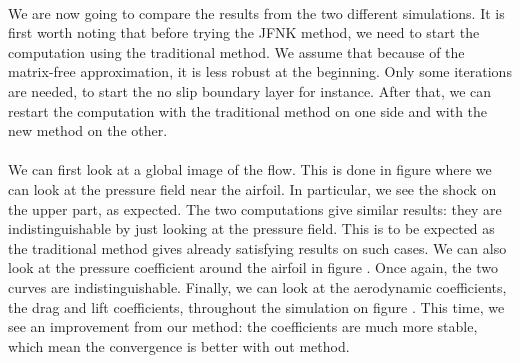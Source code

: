 


        \paragraph{}
        We are now going to compare the results from the two different simulations.
        It is first worth noting that before trying the JFNK method, we need to start the computation using the traditional method.
        We assume that because of the matrix-free approximation, it is less robust at the beginning.
        Only some iterations are needed, to start the no slip boundary layer for instance.
        After that, we can restart the computation with the traditional method on one side and with the new method on the other.

        \paragraph{}
        We can first look at a global image of the flow.
        This is done in figure  where we can look at the pressure field near the airfoil.
        In particular, we see the shock on the upper part, as expected.
        The two computations give similar results: they are indistinguishable by just looking at the pressure field.
        This is to be expected as the traditional method gives already satisfying results on such cases.
        We can also look at the pressure coefficient around the airfoil in figure .
        Once again, the two curves are indistinguishable.
        Finally, we can look at the aerodynamic coefficients, the drag and lift coefficients, throughout the simulation on figure .
        This time, we see an improvement from our method: the coefficients are much more stable, which mean the convergence is better with out method.

